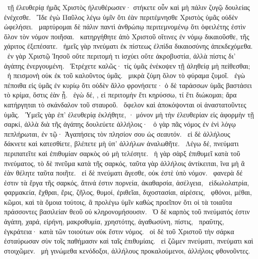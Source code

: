 ~τῇ ἐλευθερίᾳ ἡμᾶς Χριστὸς ἠλευθέρωσεν· στήκετε οὖν καὶ μὴ πάλιν ζυγῷ δουλείας ἐνέχεσθε.
~Ἴδε ἐγὼ Παῦλος λέγω ὑμῖν ὅτι ἐὰν περιτέμνησθε Χριστὸς ὑμᾶς οὐδὲν ὠφελήσει.
~μαρτύρομαι δὲ πάλιν παντὶ ἀνθρώπῳ περιτεμνομένῳ ὅτι ὀφειλέτης ἐστὶν ὅλον τὸν νόμον ποιῆσαι.
~κατηργήθητε ἀπὸ Χριστοῦ οἵτινες ἐν νόμῳ δικαιοῦσθε, τῆς χάριτος ἐξεπέσατε.
~ἡμεῖς γὰρ πνεύματι ἐκ πίστεως ἐλπίδα δικαιοσύνης ἀπεκδεχόμεθα.
~ἐν γὰρ Χριστῷ Ἰησοῦ οὔτε περιτομή τι ἰσχύει οὔτε ἀκροβυστία, ἀλλὰ πίστις δι’ ἀγάπης ἐνεργουμένη.
~Ἐτρέχετε καλῶς· τίς ὑμᾶς ἐνέκοψεν τῇ ἀληθείᾳ μὴ πείθεσθαι;
~ἡ πεισμονὴ οὐκ ἐκ τοῦ καλοῦντος ὑμᾶς.
~μικρὰ ζύμη ὅλον τὸ φύραμα ζυμοῖ.
~ἐγὼ πέποιθα εἰς ὑμᾶς ἐν κυρίῳ ὅτι οὐδὲν ἄλλο φρονήσετε· ὁ δὲ ταράσσων ὑμᾶς βαστάσει τὸ κρίμα, ὅστις ἐὰν ᾖ.
~ἐγὼ δέ, , εἰ περιτομὴν ἔτι κηρύσσω, τί ἔτι διώκομαι; ἄρα κατήργηται τὸ σκάνδαλον τοῦ σταυροῦ.
~ὄφελον καὶ ἀποκόψονται οἱ ἀναστατοῦντες ὑμᾶς.
~Ὑμεῖς γὰρ ἐπ’ ἐλευθερίᾳ ἐκλήθητε, · μόνον μὴ τὴν ἐλευθερίαν εἰς ἀφορμὴν τῇ σαρκί, ἀλλὰ διὰ τῆς ἀγάπης δουλεύετε ἀλλήλοις·
~ὁ γὰρ πᾶς νόμος ἐν ἑνὶ λόγῳ πεπλήρωται, ἐν τῷ· Ἀγαπήσεις τὸν πλησίον σου ὡς σεαυτόν.
~εἰ δὲ ἀλλήλους δάκνετε καὶ κατεσθίετε, βλέπετε μὴ ὑπ’ ἀλλήλων ἀναλωθῆτε.
~Λέγω δέ, πνεύματι περιπατεῖτε καὶ ἐπιθυμίαν σαρκὸς οὐ μὴ τελέσητε.
~ἡ γὰρ σὰρξ ἐπιθυμεῖ κατὰ τοῦ πνεύματος, τὸ δὲ πνεῦμα κατὰ τῆς σαρκός, ταῦτα γὰρ ἀλλήλοις ἀντίκειται, ἵνα μὴ ἃ ἐὰν θέλητε ταῦτα ποιῆτε.
~εἰ δὲ πνεύματι ἄγεσθε, οὐκ ἐστὲ ὑπὸ νόμον.
~φανερὰ δέ ἐστιν τὰ ἔργα τῆς σαρκός, ἅτινά ἐστιν πορνεία, ἀκαθαρσία, ἀσέλγεια,
~εἰδωλολατρία, φαρμακεία, ἔχθραι, ἔρις, ζῆλος, θυμοί, ἐριθεῖαι, διχοστασίαι, αἱρέσεις,
~φθόνοι, μέθαι, κῶμοι, καὶ τὰ ὅμοια τούτοις, ἃ προλέγω ὑμῖν καθὼς προεῖπον ὅτι οἱ τὰ τοιαῦτα πράσσοντες βασιλείαν θεοῦ οὐ κληρονομήσουσιν.
~Ὁ δὲ καρπὸς τοῦ πνεύματός ἐστιν ἀγάπη, χαρά, εἰρήνη, μακροθυμία, χρηστότης, ἀγαθωσύνη, πίστις,
~πραΰτης, ἐγκράτεια· κατὰ τῶν τοιούτων οὐκ ἔστιν νόμος.
~οἱ δὲ τοῦ Χριστοῦ τὴν σάρκα ἐσταύρωσαν σὺν τοῖς παθήμασιν καὶ ταῖς ἐπιθυμίαις.
~εἰ ζῶμεν πνεύματι, πνεύματι καὶ στοιχῶμεν.
~μὴ γινώμεθα κενόδοξοι, ἀλλήλους προκαλούμενοι, ἀλλήλοις φθονοῦντες.

